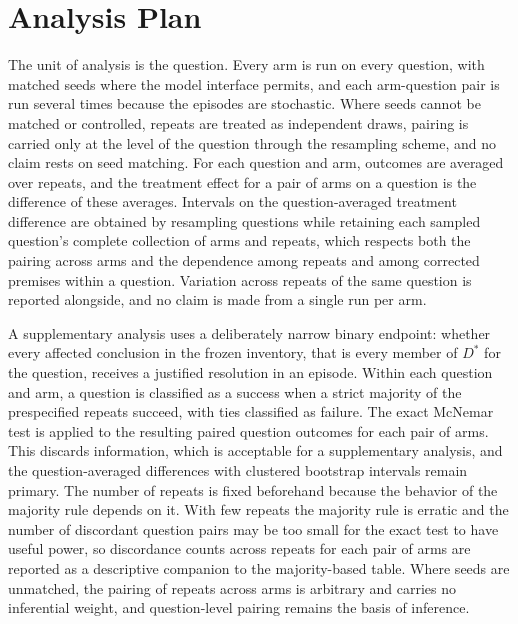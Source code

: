 \documentclass[11pt]{article}
\begin{document}
\section{Analysis Plan}\label{sec:analysis}

The unit of analysis is the question. Every arm is run on every question, with matched seeds where the model interface permits, and each arm-question pair is run several times because the episodes are stochastic. Where seeds cannot be matched or controlled, repeats are treated as independent draws, pairing is carried only at the level of the question through the resampling scheme, and no claim rests on seed matching. For each question and arm, outcomes are averaged over repeats, and the treatment effect for a pair of arms on a question is the difference of these averages. Intervals on the question-averaged treatment difference are obtained by resampling questions while retaining each sampled question's complete collection of arms and repeats, which respects both the pairing across arms and the dependence among repeats and among corrected premises within a question. Variation across repeats of the same question is reported alongside, and no claim is made from a single run per arm.

A supplementary analysis uses a deliberately narrow binary endpoint: whether every affected conclusion in the frozen inventory, that is every member of $D^{*}$ for the question, receives a justified resolution in an episode. Within each question and arm, a question is classified as a success when a strict majority of the prespecified repeats succeed, with ties classified as failure. The exact McNemar test \cite{mcnemar1947} is applied to the resulting paired question outcomes for each pair of arms. This discards information, which is acceptable for a supplementary analysis, and the question-averaged differences with clustered bootstrap intervals remain primary. The number of repeats is fixed beforehand because the behavior of the majority rule depends on it. With few repeats the majority rule is erratic and the number of discordant question pairs may be too small for the exact test to have useful power, so discordance counts across repeats for each pair of arms are reported as a descriptive companion to the majority-based table. Where seeds are unmatched, the pairing of repeats across arms is arbitrary and carries no inferential weight, and question-level pairing remains the basis of inference.
\end{document}
